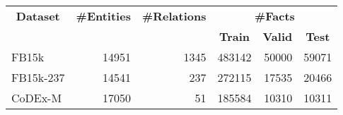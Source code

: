 \begin{tabular}{| l | r | r | r | r | r |}
    \hline

    \multicolumn{1}{|c|}{\textbf{Dataset}} &
    \multicolumn{1}{|c|}{\textbf{#Entities}} &
    \multicolumn{1}{|c|}{\textbf{#Relations}} &
    \multicolumn{3}{|c|}{\textbf{#Facts}} \\

    \multicolumn{1}{|c|}{} &
    \multicolumn{1}{|c|}{} &
    \multicolumn{1}{|c|}{} &
    \multicolumn{1}{|c|}{\textbf{Train}} &
    \multicolumn{1}{|c|}{\textbf{Valid}} &
    \multicolumn{1}{|c|}{\textbf{Test}} \\

    \hline \hline

    FB15k     & \num{14951} & \num{1345} & \num{483142} & \num{50000} & \num{59071} \\
    FB15k-237 & \num{14541} & \num{237}  & \num{272115} & \num{17535} & \num{20466} \\
    CoDEx-M   & \num{17050} & \num{51}   & \num{185584} & \num{10310} & \num{10311} \\

    \hline
\end{tabular}
